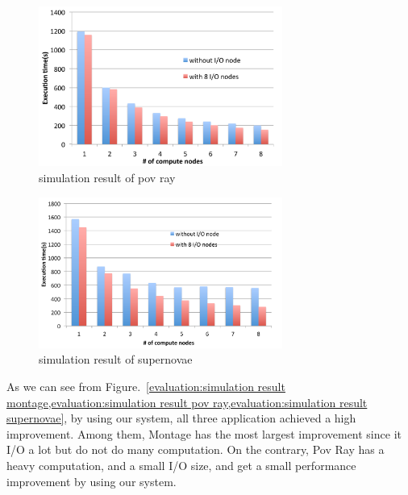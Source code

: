 \begin{figure}
\centering
\includegraphics[width=8cm]{img/simulation_povray}
\caption{simulation result of pov ray}
\label{evaluation:simulation result pov ray}
\end{figure}

\begin{figure}
\centering
\includegraphics[width=8cm]{img/simulation_supernovae}
\caption{simulation result of supernovae}
\label{evaluation:simulation result supernovae}
\end{figure}

As we can see from Figure.~\ref{evaluation:simulation result montage,evaluation:simulation result
pov ray,evaluation:simulation result supernovae}, by using our system, all three application
achieved a high improvement.
Among them, Montage has the most largest improvement since it I/O a lot but do not do many
computation.
On the contrary, Pov Ray has a heavy computation, and a small I/O size, and get a small performance
improvement by using our system.
